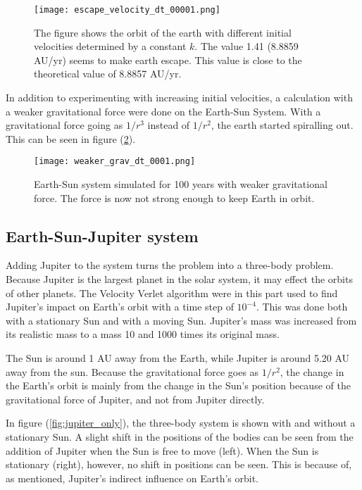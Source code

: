 \documentclass[10pt,a4paper,titlepage]{article}
\begin{document}
\begin{figure}[]
\centering
\centering\texttt{[image: escape\_velocity\_dt\_00001.png]}
\caption{The figure shows the orbit of the earth with different initial velocities determined by a constant $k$. The value 1.41 (8.8859 AU/yr) seems to make earth escape. This value is close to the theoretical value of 8.8857 AU/yr. \label{fig:escape}}
\end{figure}

In addition to experimenting with increasing initial velocities, a calculation with a weaker gravitational force were done on the Earth-Sun System. With a gravitational force going as $1/r^3$ instead of $1/r^2$, the earth started spiralling out. This can be seen in figure (\ref{fig:weaker}).

\begin{figure}[]
\centering
\centering\texttt{[image: weaker\_grav\_dt\_0001.png]}
\caption{Earth-Sun system simulated for 100 years with weaker gravitational force. The force is now not strong enough to keep Earth in orbit. \label{fig:weaker}}
\end{figure}

\subsection{Earth-Sun-Jupiter system}
Adding Jupiter to the system turns the problem into a three-body problem. Because Jupiter is the largest planet in the solar system, it may effect the orbits of other planets. The Velocity Verlet algorithm were in this part used to find Jupiter's impact on Earth's orbit with a time step of $10^{-4}$. This was done both with a stationary Sun and with a moving Sun. Jupiter's mass was increased from its realistic mass to a mass 10 and 1000 times its original mass. 

The Sun is around 1 AU away from the Earth, while Jupiter is around 5.20 AU away from the sun. Because the gravitational force goes as $1/r^2$, the change in the Earth's orbit is mainly from the change in the Sun's position because of the gravitational force of Jupiter, and not from Jupiter directly. 

In figure (\ref{fig:jupiter_only}), the three-body system is shown with and without a stationary Sun. A slight shift in the positions of the bodies can be seen from the addition of Jupiter when the Sun is free to move (left). When the Sun is stationary (right), however, no shift in positions can be seen. This is because of, as mentioned, Jupiter's indirect influence on Earth's orbit.
\end{document}
